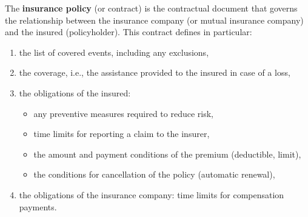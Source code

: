 \begin{f}
	
	The \textbf{insurance policy} (or contract) is the contractual document that governs the relationship between the insurance company (or mutual insurance company) and the insured (policyholder). 
	This contract defines in particular:
	
	\begin{enumerate}
		\item the list of covered events, including any exclusions,
		\item the coverage, i.e., the assistance provided to the insured in case of a loss,
		\item the obligations of the insured:
		\begin{itemize}
			\item any preventive measures required to reduce risk,
			\item time limits for reporting a claim to the insurer,
			\item the amount and payment conditions of the premium (deductible, limit),
			\item the conditions for cancellation of the policy (automatic renewal),
		\end{itemize}
		\item the obligations of the insurance company: time limits for compensation payments.
		
	\end{enumerate}
	
\end{f}
